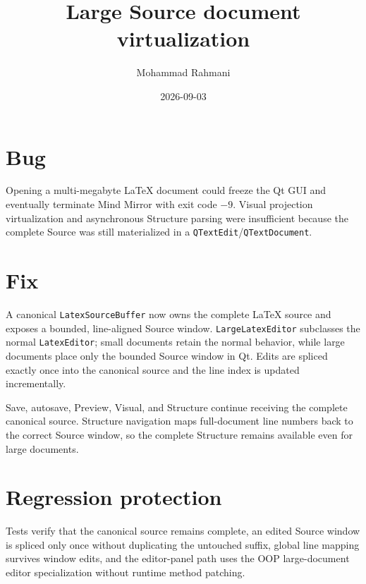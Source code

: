 \documentclass[a4paper]{article}
\title{Large Source document virtualization}
\date{2026-09-03}
\author{Mohammad Rahmani}
\begin{document}
\maketitle

\section{Bug}
Opening a multi-megabyte LaTeX document could freeze the Qt GUI and eventually
terminate Mind Mirror with exit code $-9$. Visual projection virtualization and
asynchronous Structure parsing were insufficient because the complete Source
was still materialized in a \texttt{QTextEdit}/\texttt{QTextDocument}.

\section{Fix}
A canonical \texttt{LatexSourceBuffer} now owns the complete LaTeX source and
exposes a bounded, line-aligned Source window. \texttt{LargeLatexEditor}
subclasses the normal \texttt{LatexEditor}; small documents retain the normal
behavior, while large documents place only the bounded Source window in Qt.
Edits are spliced exactly once into the canonical source and the line index is
updated incrementally.

Save, autosave, Preview, Visual, and Structure continue receiving the complete
canonical source. Structure navigation maps full-document line numbers back to
the correct Source window, so the complete Structure remains available even for
large documents.

\section{Regression protection}
Tests verify that the canonical source remains complete, an edited Source
window is spliced only once without duplicating the untouched suffix, global
line mapping survives window edits, and the editor-panel path uses the OOP
large-document editor specialization without runtime method patching.
\end{document}
